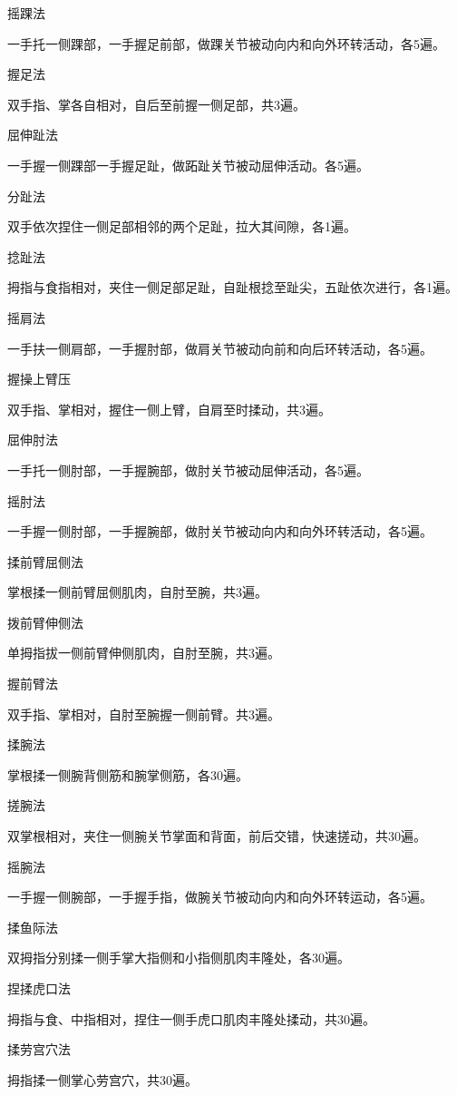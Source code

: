 \documentclass[12pt,UTF8]{ctexbook}
\begin{document}
摇踝法

一手托一侧踝部，一手握足前部，做踝关节被动向内和向外环转活动，各5遍。

握足法

双手指、掌各自相对，自后至前握一侧足部，共3遍。

屈伸趾法

一手握一侧踝部一手握足趾，做跖趾关节被动屈伸活动。各5遍。

分趾法

双手依次捏住一侧足部相邻的两个足趾，拉大其间隙，各1遍。

捻趾法

拇指与食指相对，夹住一侧足部足趾，自趾根捻至趾尖，五趾依次进行，各1遍。

摇肩法

一手扶一侧肩部，一手握肘部，做肩关节被动向前和向后环转活动，各5遍。

握操上臂压

双手指、掌相对，握住一侧上臂，自肩至时揉动，共3遍。

屈伸肘法

一手托一侧肘部，一手握腕部，做肘关节被动屈伸活动，各5遍。

摇肘法

一手握一侧肘部，一手握腕部，做肘关节被动向内和向外环转活动，各5遍。

揉前臂屈侧法

掌根揉一侧前臂屈侧肌肉，自肘至腕，共3遍。

拨前臂伸侧法

单拇指拔一侧前臂伸侧肌肉，自肘至腕，共3遍。

握前臂法

双手指、掌相对，自肘至腕握一侧前臂。共3遍。

揉腕法

掌根揉一侧腕背侧筋和腕掌侧筋，各30遍。

搓腕法

双掌根相对，夹住一侧腕关节掌面和背面，前后交错，快速搓动，共30遍。

摇腕法

一手握一侧腕部，一手握手指，做腕关节被动向内和向外环转运动，各5遍。

揉鱼际法

双拇指分别揉一侧手掌大指侧和小指侧肌肉丰隆处，各30遍。

捏揉虎口法

拇指与食、中指相对，捏住一侧手虎口肌肉丰隆处揉动，共30遍。

揉劳宫穴法

拇指揉一侧掌心劳宫穴，共30遍。
\end{document}
